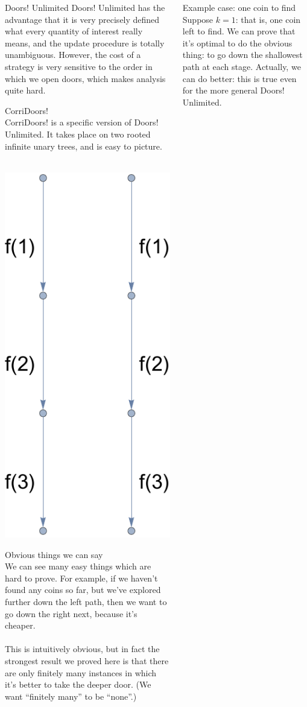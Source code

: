 \documentclass[final]{beamer}
\begin{document}
\begin{columns}[t]
\begin{column}{.3 \linewidth}
\begin{block}{Doors! Unlimited}
Doors! Unlimited has the advantage that it is very precisely defined what every quantity of interest really means, and the update procedure is totally unambiguous.
However, the cost of a strategy is very sensitive to the order in which we open doors, which makes analysis quite hard.
\end{block}
\vspace{\baselineskip}


\begin{block}{CorriDoors!}\ \\
CorriDoors! is a specific version of Doors! Unlimited.
It takes place on two rooted infinite unary trees, and is easy to picture. \\~\\

\begin{center}
\includegraphics[width=0.09 \linewidth]{corridoorsgraph}
\end{center}
\end{block}
\vspace{\baselineskip}

\begin{block}{Obvious things we can say}\ \\
We can see many easy things which are hard to prove.
For example, if we haven't found any coins so far, but we've explored further down the left path, then we want to go down the right next, because it's cheaper. \\~\\
This is intuitively obvious, but in fact the strongest result we proved here is that there are only finitely many instances in which it's better to take the deeper door.
(We want ``finitely many'' to be ``none''.)
\end{block}
\vspace{\baselineskip}


\end{column}


\begin{column}{.3 \linewidth}

\begin{block}{Example case: one coin to find}\ \\
Suppose $k=1$: that is, one coin left to find.
We can prove that it's optimal to do the obvious thing: to go down the shallowest path at each stage.
Actually, we can do better: this is true even for the more general Doors! Unlimited. \\~\\


\end{block}
\end{column}
\end{columns}
\end{document}
